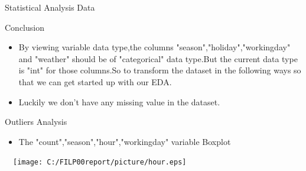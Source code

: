 \documentclass[
 size=14pt,
 paper=smartboard,  %
 mode=present, 		%
 display=slides, 	%
 style=tuliplab,  	%
 pauseslide,
 fleqn,leqno]{powerdot}
\begin{document}
\begin{slide}[toc=,bm=]{Statistical Analysis Data}
\begin{table}[tb]
\setlength{\abovecaptionskip}{0pt}
\setlength{\belowcaptionskip}{10pt}
\centering
\caption{The first Two Rows of The Train Data}
\end{table}
{Conclusion
\begin{itemize}
\item
\smallskip
By viewing variable data type,the columns "season","holiday","workingday" and "weather" should be of "categorical" data type.But the current data type is "int" for those columns.So to transform the dataset in the following ways so that we can get started up with our EDA.
\smallskip
\item
\smallskip
Luckily we don't have any missing value in the dataset.
\end{itemize}
}
\end{slide}



\begin{slide}[toc=,bm=]{Outliers Analysis}
\begin{itemize}
\item
The "count","season","hour","workingday" variable Boxplot
\end{itemize}
\vspace{-0.8cm}
\begin{center}
  \texttt{[image: C:/FILP00report/picture/hour.eps]}
\end{center}
\end{slide}
\end{document}
